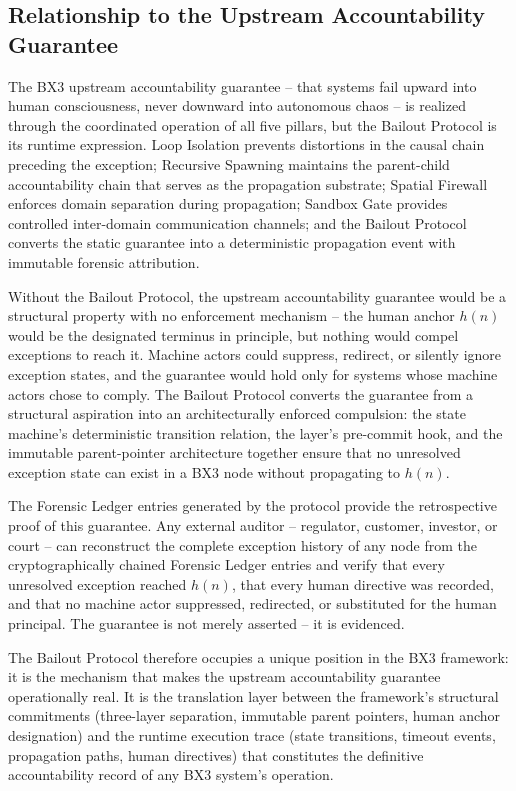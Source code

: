 \subsection{Relationship to the Upstream Accountability Guarantee}\label{sec:bailout-uag}

The BX3 upstream accountability guarantee -- that systems fail upward into human
consciousness, never downward into autonomous chaos -- is realized through the
coordinated operation of all five pillars, but the Bailout Protocol is its
runtime expression.  Loop Isolation prevents distortions in the causal chain
preceding the exception; Recursive Spawning maintains the parent-child
accountability chain that serves as the propagation substrate; Spatial Firewall
enforces domain separation during propagation; Sandbox Gate provides controlled
inter-domain communication channels; and the Bailout Protocol converts the
static guarantee into a deterministic propagation event with immutable forensic
attribution.

Without the Bailout Protocol, the upstream accountability guarantee would be
a structural property with no enforcement mechanism -- the human anchor $h(n)$
would be the designated terminus in principle, but nothing would compel
exceptions to reach it.  Machine actors could suppress, redirect, or silently
ignore exception states, and the guarantee would hold only for systems whose
machine actors chose to comply.  The Bailout Protocol converts the guarantee
from a structural aspiration into an architecturally enforced compulsion: the
state machine's deterministic transition relation, the \fact{} layer's
pre-commit hook, and the immutable parent-pointer architecture together ensure
that no unresolved exception state can exist in a BX3 node without propagating
to $h(n)$.

The Forensic Ledger entries generated by the protocol provide the retrospective
proof of this guarantee.  Any external auditor -- regulator, customer, investor,
or court -- can reconstruct the complete exception history of any node from
the cryptographically chained Forensic Ledger entries and verify that every
unresolved exception reached $h(n)$, that every human directive was recorded,
and that no machine actor suppressed, redirected, or substituted for the human
principal.  The guarantee is not merely asserted -- it is evidenced.

The Bailout Protocol therefore occupies a unique position in the BX3 framework:
it is the mechanism that makes the upstream accountability guarantee
operationally real.  It is the translation layer between the framework's
structural commitments (three-layer separation, immutable parent pointers, human
anchor designation) and the runtime execution trace (state transitions, timeout
events, propagation paths, human directives) that constitutes the definitive
accountability record of any BX3 system's operation.